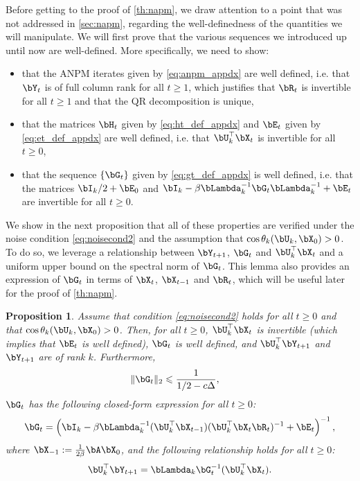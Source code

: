 \documentclass{article}
\theoremstyle{plain}
\newtheorem{proposition}[theorem]{Proposition}
\theoremstyle{definition}
\theoremstyle{remark}
\begin{document}
Before getting to the proof of \cref{th:napm}, we draw attention to a point that was not addressed in \cref{sec:napm}, regarding the well-definedness of the quantities we will manipulate. We will first prove that the various sequences we introduced up until now are well-defined. More specifically, we need to show:
\begin{itemize}
  \item that the ANPM iterates given by \eqref{eq:anpm_appdx} are well defined, i.e. that $\bY_t$ is of full column rank for all $t\geqslant 1$, which justifies that $\bR_t$ is invertible for all $t\geqslant 1$ and that the QR decomposition is unique,
  \item that the matrices $\bH_t$ given by \eqref{eq:ht_def_appdx} and $\bE_t$ given by \eqref{eq:et_def_appdx} are well defined, i.e. that $\bU_k^\top \bX_t$ is invertible for all $t\geqslant 0$,
  \item that the sequence $\{\bG_t\}$ given by \eqref{eq:gt_def_appdx} is well defined, i.e. that the matrices $\bI_k/2 + \bE_0$ and $\bI_k - \beta\bLambda^{-1}_k \bG_t \bLambda_k^{-1} + \bE_t$ are invertible for all $t\geqslant 0$.
\end{itemize}
We show in the next proposition that all of these properties are verified under the noise condition \eqref{eq:noisecond2} and the assumption that $\cos\theta_k(\bU_k,\bX_0) > 0$. To do so, we leverage a relationship between $\bY_{t+1}$, $\bG_t$ and $\bU_k^\top\bX_t$ and a uniform upper bound on the spectral norm of $\bG_t$. This lemma also provides an expression of $\bG_t$ in terms of $\bX_t$, $\bX_{t-1}$ and $\bR_t$, which will be useful later for the proof of \cref{th:napm}.

\begin{proposition}\label{lemma:well_defined}
  Assume that condition \eqref{eq:noisecond2} holds for all $t\geqslant 0$ and that $\cos\theta_k(\bU_k,\bX_0) > 0$. Then, for all $t\geqslant 0$, $\bU_k^\top \bX_t$ is invertible (which implies that $\bE_t$ is well defined), $\bG_t$ is well defined, and $\bU_k^\top\bY_{t+1}$ and $\bY_{t+1}$ are of rank $k$. Furthermore,
  \begin{align}
    & \Vert \bG_t \Vert_2 \leqslant \frac{1}{1/2 - c\Delta}, \label{eq:gt_bound}
  \end{align}
  $\bG_t$ has the following closed-form expression for all $t\geqslant 0$:
  \begin{align}\label{eq:gt_closed_form}
    \bG_t = \left( \bI_k - \beta\bLambda_k^{-1}(\bU_k^\top \bX_{t-1}) (\bU_k^\top \bX_{t}\bR_t)^{-1} + \bE_t\right)^{-1},
  \end{align}  
  where $\bX_{-1} := \frac{1}{2\beta}\bA\bX_0$, and the following relationship holds for all $t\geqslant 0$:
  \begin{align}
    \bU_k^\top\bY_{t+1} = \bLambda_k \bG_t^{-1} (\bU_k^\top \bX_t). \label{eq:ukty_relation}
  \end{align}
\end{proposition}
\end{document}
